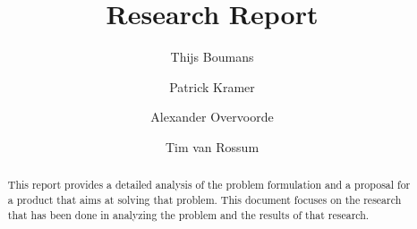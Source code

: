 \documentclass{report}
\title{Research Report}
\author{Thijs Boumans \and Patrick Kramer \and 
        Alexander Overvoorde \and Tim van Rossum}
\begin{document}
\maketitle

\begin{abstract}
This report provides a detailed analysis of the problem formulation and a 
proposal for a product that aims at solving that problem. This document 
focuses on the research that has been done in analyzing the problem and the 
results of that research.
\end{abstract}

\tableofcontents






\pagebreak %

\end{document}
